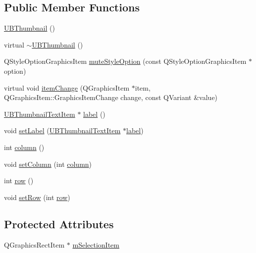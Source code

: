 \subsection*{Public Member Functions}
\begin{DoxyCompactItemize}
\item 
\hyperlink{class_u_b_thumbnail_a190821218d11d76d6acaadddbcb4c4e4}{U\-B\-Thumbnail} ()
\item 
virtual \hyperlink{class_u_b_thumbnail_a4dfe4fe4b8bbf594f36a937112021d5f}{$\sim$\-U\-B\-Thumbnail} ()
\item 
Q\-Style\-Option\-Graphics\-Item \hyperlink{class_u_b_thumbnail_a8ef5dcefd4ec1ce9b877c5d05a05ed86}{mute\-Style\-Option} (const Q\-Style\-Option\-Graphics\-Item $\ast$option)
\item 
virtual void \hyperlink{class_u_b_thumbnail_a6281474a2b13d4c76c6e4e213de6ef93}{item\-Change} (Q\-Graphics\-Item $\ast$item, Q\-Graphics\-Item\-::\-Graphics\-Item\-Change change, const Q\-Variant \&value)
\item 
\hyperlink{class_u_b_thumbnail_text_item}{U\-B\-Thumbnail\-Text\-Item} $\ast$ \hyperlink{class_u_b_thumbnail_a21a445699f315e12eddc316ee15ca80d}{label} ()
\item 
void \hyperlink{class_u_b_thumbnail_a0ff204ad591df994cadf60bf9fe24db3}{set\-Label} (\hyperlink{class_u_b_thumbnail_text_item}{U\-B\-Thumbnail\-Text\-Item} $\ast$\hyperlink{class_u_b_thumbnail_a21a445699f315e12eddc316ee15ca80d}{label})
\item 
int \hyperlink{class_u_b_thumbnail_a951ab00bd0f500a4b7ee908de1f14504}{column} ()
\item 
void \hyperlink{class_u_b_thumbnail_aea15e8dae40d0ff2f309ea79560f2a0d}{set\-Column} (int \hyperlink{class_u_b_thumbnail_a951ab00bd0f500a4b7ee908de1f14504}{column})
\item 
int \hyperlink{class_u_b_thumbnail_a84ed4fea9e8596864ea91e44ef2b554c}{row} ()
\item 
void \hyperlink{class_u_b_thumbnail_ae5f3a2b52f87e1e3c3ed51ce4a045912}{set\-Row} (int \hyperlink{class_u_b_thumbnail_a84ed4fea9e8596864ea91e44ef2b554c}{row})
\end{DoxyCompactItemize}
\subsection*{Protected Attributes}
\begin{DoxyCompactItemize}
\item 
Q\-Graphics\-Rect\-Item $\ast$ \hyperlink{class_u_b_thumbnail_a40a2d16aea31b6963a83a32fc282a049}{m\-Selection\-Item}
\end{DoxyCompactItemize}


